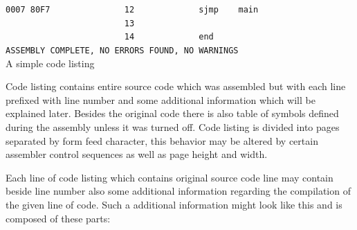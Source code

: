 \documentclass[a4paper,twoside,12pt]{book}
\begin{document}
\begin{code}[h]
			{\color{highlight_lst_address}\verb'0007'}{\color{highlight_lst_code}\verb' 80F7'}{\color{highlight_lst_line}\verb'               12'}\verb'             '{\color{highlight_instruction}\verb'sjmp'}\verb'    '{\color{highlight_constant}\verb'main'}\\
			{\color{highlight_lst_line}\verb'                        13'}\\
			{\color{highlight_lst_line}\verb'                        14'}\verb'             '{\color{highlight_directive}\verb'end'}\\
			{\color{highlight_lst_msg}\verb'ASSEMBLY COMPLETE,'}\verb' NO ERRORS FOUND, NO WARNINGS'\\
			\caption{A simple code listing}
		\end{code}
		Code listing contains entire source code which was assembled but with each line prefixed with line number and some additional information which will be explained later. Besides the original code there is also table of symbols defined during the assembly unless it was turned off. Code listing is divided into pages separated by form feed character, this behavior may be altered by certain assembler control sequences as well as page height and width.

		Each line of code listing which contains original source code line may contain beside line number also some additional information regarding the compilation of the given line of code. Such a additional information might look like this and is composed of these parts:
\end{document}
